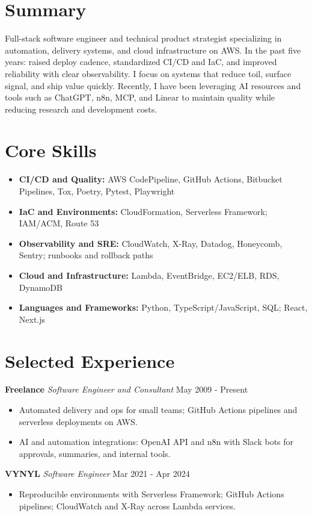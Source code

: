 \documentclass[10pt]{article}
\begin{document}
\section*{Summary}
Full-stack software engineer and technical product strategist specializing in automation, delivery systems, and cloud infrastructure on AWS. In the past five years: raised deploy cadence, standardized CI/CD and IaC, and improved reliability with clear observability. I focus on systems that reduce toil, surface signal, and ship value quickly. Recently, I have been leveraging AI resources and tools such as ChatGPT, n8n, MCP, and Linear to maintain quality while reducing research and development costs.

\section*{Core Skills}
\begin{itemize}[leftmargin=*]
  \item \textbf{CI/CD and Quality:} AWS CodePipeline, GitHub Actions, Bitbucket Pipelines, Tox, Poetry, Pytest, Playwright
  \item \textbf{IaC and Environments:} CloudFormation, Serverless Framework; IAM/ACM, Route 53
  \item \textbf{Observability and SRE:} CloudWatch, X-Ray, Datadog, Honeycomb, Sentry; runbooks and rollback paths
  \item \textbf{Cloud and Infrastructure:} Lambda, EventBridge, EC2/ELB, RDS, DynamoDB
  \item \textbf{Languages and Frameworks:} Python, TypeScript/JavaScript, SQL; React, Next.js
\end{itemize}

\section*{Selected Experience}
\noindent\textbf{Freelance} \textit{Software Engineer and Consultant} \hfill May 2009 - Present\par
\begin{itemize}
  \item Automated delivery and ops for small teams; GitHub Actions pipelines and serverless deployments on AWS.
  \item AI and automation integrations: OpenAI API and n8n with Slack bots for approvals, summaries, and internal tools.
\end{itemize}

\noindent\textbf{VYNYL} \textit{Software Engineer} \hfill Mar 2021 - Apr 2024\par
\begin{itemize}
  \item Reproducible environments with Serverless Framework; GitHub Actions pipelines; CloudWatch and X-Ray across Lambda services.
\end{itemize}
\end{document}
